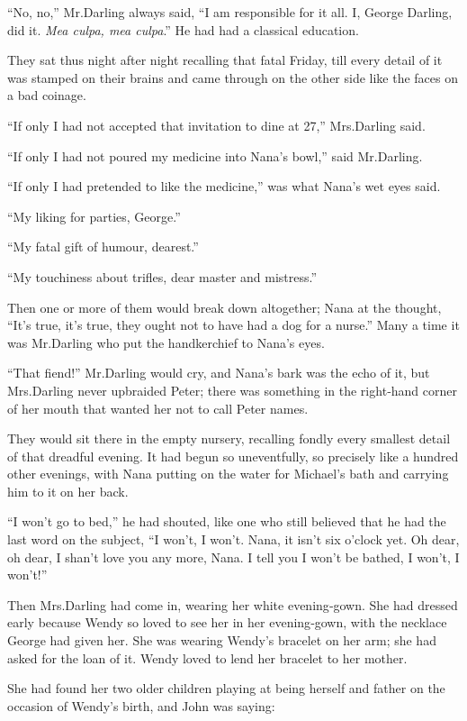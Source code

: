 “No, no,” Mr.\@ Darling always said,
“I am responsible for it all.
I, George Darling, did it.
\emph{Mea culpa, mea culpa}.”
He had had a classical education.

They sat thus night after night recalling that fatal Friday,
till every detail of it was stamped on their brains
and came through on the other side like the faces on a bad coinage.

“If only I had not accepted that invitation to dine at 27,” Mrs.\@ Darling said.

“If only I had not poured my medicine into Nana’s bowl,” said Mr.\@ Darling.

“If only I had pretended to like the medicine,” was what Nana’s wet eyes said.

“My liking for parties, George.”

“My fatal gift of humour, dearest.”

“My touchiness about trifles, dear master and mistress.”

Then one or more of them would break down altogether;
Nana at the thought, “It’s true, it’s true, they ought not to have had a dog for a nurse.”
Many a time it was Mr.\@ Darling who put the handkerchief to Nana’s eyes.

“That fiend!\@” Mr.\@ Darling would cry, and Nana’s bark was the echo of it,
but Mrs.\@ Darling never upbraided Peter;
there was something in the right‐hand corner of her mouth that wanted her not to call Peter names.

They would sit there in the empty nursery,
recalling fondly every smallest detail of that dreadful evening.
It had begun so uneventfully, so precisely like a hundred other evenings,
with Nana putting on the water for Michael’s bath and carrying him to it on her back.

“I won’t go to bed,” he had shouted,
like one who still believed that he had the last word on the subject,
“I won’t, I won’t.
Nana, it isn’t six o’clock yet.
Oh dear, oh dear, I shan’t love you any more, Nana.
I tell you I won’t be bathed, I won’t, I won’t!”

Then Mrs.\@ Darling had come in, wearing her white evening‐gown.
She had dressed early because Wendy so loved to see her in her evening‐gown,
with the necklace George had given her.
She was wearing Wendy’s bracelet on her arm;
she had asked for the loan of it.
Wendy loved to lend her bracelet to her mother.

She had found her two older children playing at being herself and father on the occasion of Wendy’s birth,
and John was saying:

